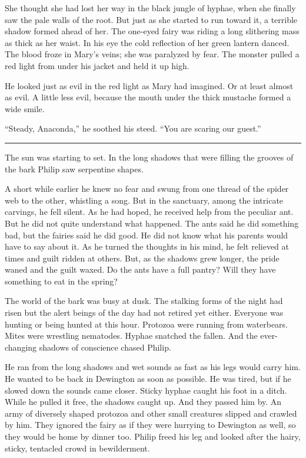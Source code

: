\documentclass[10pt]{memoir}
\renewcommand{\pfbreakdisplay}{\bigskip \ding{166} \bigskip}
\newcommand{\secbreak}{\fancybreak{\pfbreakdisplay}}
\begin{document}
She thought she had lost her way in the black jungle of hyphae, when she
finally saw the pale walls of the root. But just as she started to run toward
it, a terrible shadow formed ahead of her. The one-eyed fairy was riding a long
slithering mass as thick as her waist. In his eye the cold reflection of her
green lantern danced. The blood froze in Mary's veins; she was paralyzed by
fear. The monster pulled a red light from under his jacket and held it up high.

He looked just as evil in the red light as Mary had imagined. Or at least
almost as evil. A little less evil, because the mouth under the thick mustache
formed a wide smile.

``Steady, Anaconda,'' he soothed his steed. ``You are scaring our guest.''

\secbreak

The sun was starting to set. In the long shadows that were filling the grooves
of the bark Philip saw serpentine shapes.

A short while earlier he knew no fear and swung from one thread of the spider
web to the other, whistling a song. But in the sanctuary, among the intricate
carvings, he fell silent. As he had hoped, he received help from the peculiar
ant. But he did not quite understand what happened. The ants said he did
something bad, but the fairies said he did good. He did not know what his
parents would have to say about it. As he turned the thoughts in his mind, he
felt relieved at times and guilt ridden at others. But, as the shadows grew
longer, the pride waned and the guilt waxed. Do the ants have a full pantry?
Will they have something to eat in the spring?

The world of the bark was busy at dusk. The stalking forms of the night had
risen but the alert beings of the day had not retired yet either. Everyone was
hunting or being hunted at this hour. Protozoa were running from waterbears.
Mites were wrestling nematodes. Hyphae snatched the fallen. And the
ever-changing shadows of conscience chased Philip.

He ran from the long shadows and wet sounds as fast as his legs would carry
him. He wanted to be back in Dewington as soon as possible. He was tired, but
if he slowed down the sounds came closer. Sticky hyphae caught his foot in a
ditch. While he pulled it free, the shadows caught up. And they passed him by.
An army of diversely shaped protozoa and other small creatures slipped and
crawled by him. They ignored the fairy as if they were hurrying to Dewington as
well, so they would be home by dinner too. Philip freed his leg and looked
after the hairy, sticky, tentacled crowd in bewilderment.
\end{document}
